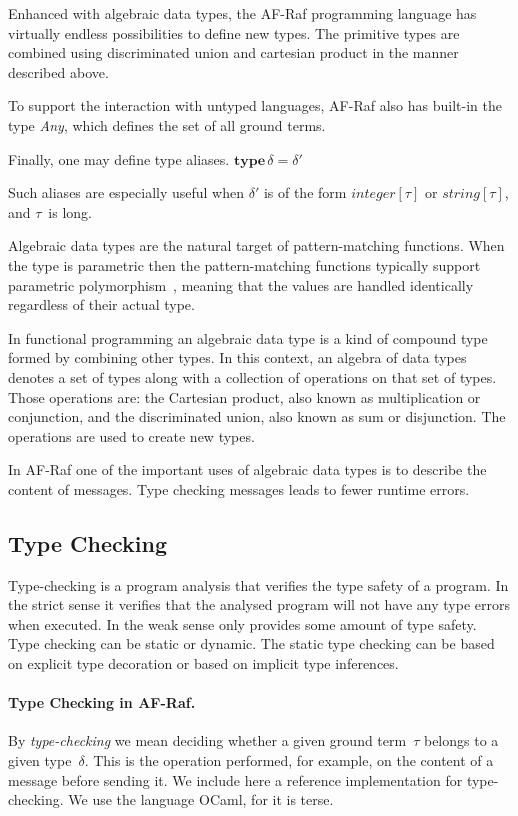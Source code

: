 \documentclass[a4paper,12pt,oneside,fleqn]{book} %
\newcommand{\todo}[1]{[\textcolor{red}{TODO}: #1]}
\begin{document}
Enhanced with algebraic data types, the AF-Raf programming language has
virtually endless possibilities to define new types. The primitive types
are combined using discriminated union and cartesian product in the manner
described above.

To support the interaction with untyped languages, AF-Raf also has built-in
the type \textit{Any}, which defines the set of all ground terms.

Finally, one may define type aliases.
$\mathbf{type}\,\delta=\delta'$

Such aliases are especially useful when $\delta'$ is of the form
$\mathit{integer}[\tau]$ or $\mathit{string}[\tau]$, and $\tau$~is long.


Algebraic data types are the natural target of pattern-matching functions.
When the type is parametric then the pattern-matching functions typically
support parametric polymorphism~\cite{AlgebraicDT09}, meaning that the
values are handled identically regardless of their actual type.

In functional programming an algebraic data type is a kind of compound type
formed by combining other types. In this context, an algebra of data types
denotes a set of types along with a collection of operations on that set of
types. Those operations are: the Cartesian product, also known as
multiplication or conjunction, and the discriminated union, also known as
sum or disjunction. The operations are used to create new types.

In AF-Raf one of the important uses of algebraic data types is to describe the content of
messages. Type checking messages leads to fewer runtime errors.

\subsection{Type Checking}\label{sec:concepts-adt-check} %
Type-checking is a program analysis that verifies the type safety of a
program. In the strict sense it verifies that the analysed program
will not have any type errors when executed. In the weak sense only
provides some amount of type safety. Type checking can be static or
dynamic. The static type checking can be based on explicit type decoration
or based on implicit type inferences.


\paragraph{Type Checking in AF-Raf.}
By \emph{type-checking} we mean deciding whether a given ground term~$\tau$
belongs to a given type~$\delta$. This is the operation performed, for
example, on the content of a message before sending it. We include here a
reference implementation for type-checking. We use the language OCaml, for
it is terse.
\end{document}

